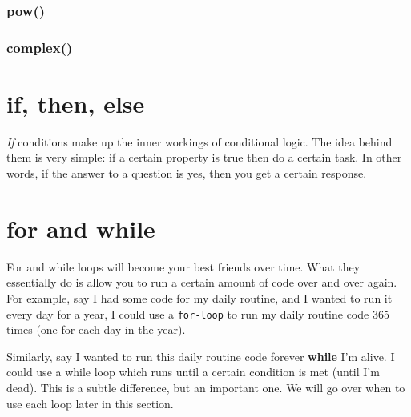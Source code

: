 \documentclass[12pt,a4paper]{book}
\begin{document}
				\subsubsection{pow()}
					\vspace{7cm}

				\subsubsection{complex()}
					\vspace{7cm}

		\section{if, then, else}
			\textit{If} conditions make up the inner workings of conditional logic. The idea behind them is very simple: if a certain property is true then do a certain task. In other words, if the answer to a question is yes, then you get a certain response.
			\vspace{10cm}
		\section{for and while}
				For and while loops will become your best friends over time. What they essentially do is allow you to run a certain amount of code over and over again. For example, say I had some code for my daily routine, and I wanted to run it every day for a year, I could use a \texttt{for-loop} to run my daily routine code 365 times (one for each day in the year). 
				
				Similarly, say I wanted to run this daily routine code forever \textbf{while} I'm alive. I could use a while loop which runs until a certain condition is met (until I'm dead). This is a subtle difference, but an important one. We will go over when to use each loop later in this section.
\end{document}
